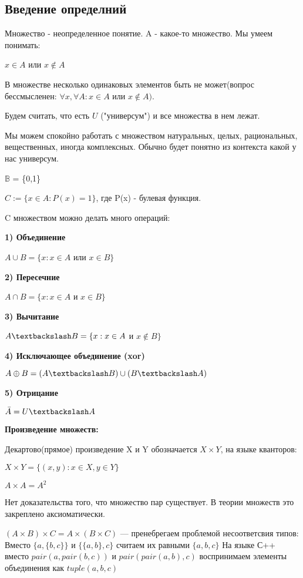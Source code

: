 
\subsection{Введение определний}
Множество - неопределенное понятие. A - какое-то множество. Мы умеем понимать:

$x \in A$ или $x \notin A$ 

В множестве несколько одинаковых элементов быть не может(вопрос бессмысленен:  $\forall x, \forall A: x \in  A  $ или $ x \notin A).$

Будем считать, что есть $U$ ("универсум") и все множества в нем лежат.

Мы можем спокойно работать с множеством натуральных, целых, рациональных, вещественных, иногда комплексных. Обычно будет понятно из контекста какой у нас универсум.

$\mathbb{B}$ = \{0,1\}

$C:=\{x \in A: P(x) = 1\}$, где P(x) - булевая функция.

C множеством можно делать много операций:

\textbf{1) Объединение}

$A \cup B = \{x: x \in A$  или $x \in B \}$

\textbf{2) Пересечние}

$A \cap B = \{x: x \in A$ и $x \in B \}$

\textbf{3) Вычитание}

$A \textbackslash B = \{x: x \in A$ и $x \notin B \}$

\textbf{4) Исключающее объединение (xor)}

$A \oplus B = (A \textbackslash B) \cup (B \textbackslash A)$

\textbf{5) Отрицание}

$\bar{A} = U \textbackslash A$

\textbf{Произведение множеств:}

Декартово(прямое) произведение X и Y обозначается $X \times Y$, на языке кванторов:

 $X \times Y = \{(x,y):x \in X, y \in Y\}$ 
 
$A \times A = A^2$

Нет доказательства того, что множество пар существует. В теории множеств это закреплено аксиоматически.

$(A \times B) \times C = A \times (B \times C)$ --- пренебрегаем проблемой несоответсвия типов:
Вместо $\{a, \{b, c\}\}$ и $\{\{a, b\}, c\}$ считаем их равными $\{a, b, c\}$
На языке С++ вместо $pair(a, pair(b, c))$  и $pair(pair(a, b), c)$  воспринимаем элементы объединения как $tuple(a, b, c)$


